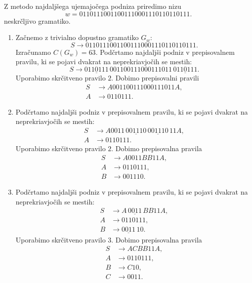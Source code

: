 \documentclass[fin1, tisk]{fmfdelo}
\theoremstyle{definition}
\begin{document}
\begin{primer}
    Z metodo najdaljšega ujemajočega podniza priredimo nizu 
    \[
        w = 01101110011001110001110110110111.
    \]
    neskrčljivo gramatiko. 
    \begin{enumerate} 
    
        \item Začnemo z trivialno dopustno gramatiko $G_w$:
        \[
            S \rightarrow 01101110011001110001110110110111.
        \]
        Izračunamo $C(G_w) = 63$. Podčrtamo najdaljši podniz v prepisovalnem pravilu, ki se pojavi
        dvakrat na neprekriavjočih se mestih:
        \[
            S \rightarrow \underline{0110111} \, 001100111000111011 \, \underline{0110111}.
        \]
        Uporabimo skrčitveno pravilo $2$. Dobimo prepisovalni pravili
        \begin{align*}
            S &\rightarrow A 001100111000111011 A, \\
            A &\rightarrow 0110111.
        \end{align*}

        \item Podčrtamo najdaljši podniz v prepisovalnem pravilu, ki se pojavi
        dvakrat na neprekriavjočih se mestih:
        \begin{align*}
            S &\rightarrow A0011 \, \underline{001110} \, \underline{001110} \, 11A, \\
            A &\rightarrow 0110111.
        \end{align*}
        Uporabimo skrčitveno pravilo $2$. Dobimo prepisovalna pravila
        \begin{align*}
            S &\rightarrow A0011BB11A, \\
            A &\rightarrow 0110111, \\
            B &\rightarrow 001110.
        \end{align*}

        \item Podčrtamo najdaljši podniz v prepisovalnem pravilu, ki se pojavi
        dvakrat na neprekriavjočih se mestih:
        \begin{align*}
            S &\rightarrow A \, \underline{0011} \, BB11A, \\
            A &\rightarrow 0110111, \\
            B &\rightarrow \underline{0011} \, 10.
        \end{align*}
        Uporabimo skrčitveno pravilo $3$. Dobimo prepisovalna pravila
        \begin{align*}
            S &\rightarrow ACBB11A, \\
            A &\rightarrow 0110111, \\
            B &\rightarrow C10, \\
            C &\rightarrow 0011.
        \end{align*}
        

\end{enumerate}
\end{primer}
\end{document}
